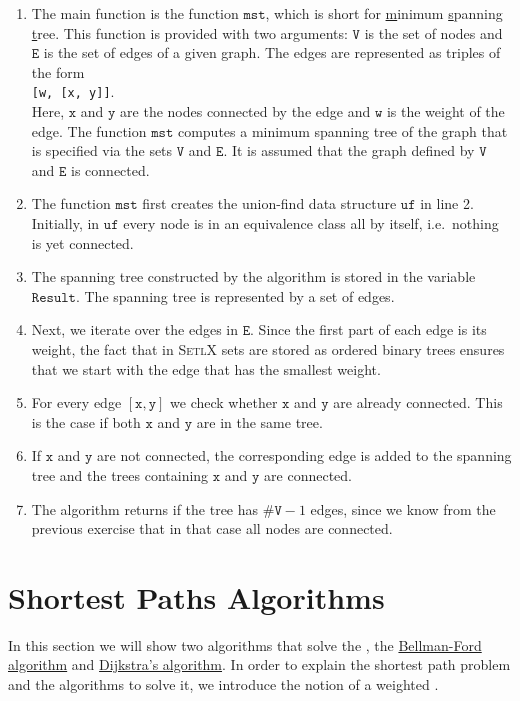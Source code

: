 \begin{enumerate}
\item The main function is the function $\mathtt{mst}$, which is short for \underline{m}inimum
      \underline{s}panning \underline{t}ree.  This function is provided with two arguments:
      $\mathtt{V}$ is the set of nodes and $\mathtt{E}$ is the set of edges of a given graph.  The edges are represented as
      triples of the form
      \\[0.2cm]
      \hspace*{1.3cm}
      \texttt{[w, [x, y]]}.
      \\[0.2cm] 
      Here, $\mathtt{x}$ and $\mathtt{y}$ are the nodes connected by the edge and $\mathtt{w}$ is the
      weight of the edge.  The function $\mathtt{mst}$ computes a minimum spanning tree of  the
      graph that is specified via the sets $\mathtt{V}$ and $\mathtt{E}$.  It is assumed that the graph
      defined by $\mathtt{V}$ and $\mathtt{E}$ is connected.
\item The function $\mathtt{mst}$ first creates the union-find data structure $\mathtt{uf}$ in line 2.
      Initially, in $\mathtt{uf}$ every node is in an equivalence class all by itself, i.e.~nothing is
      yet connected.
\item The spanning tree constructed by the algorithm is stored in the variable $\mathtt{Result}$.
      The spanning tree is represented by a set of edges.  
\item Next, we iterate over the edges in $\mathtt{E}$.  Since the first part of each edge is its
      weight, the fact that in \textsc{SetlX} sets are stored as ordered binary trees ensures that
      we start with the edge that has the smallest weight.
\item For every edge $[\mathtt{x},\mathtt{y}]$ we check whether $\mathtt{x}$ and $\mathtt{y}$ are already
      connected.  This is the case if both $\mathtt{x}$ and $\mathtt{y}$ are in the same tree.
\item If $\mathtt{x}$ and $\mathtt{y}$ are not connected, the corresponding edge is added to the
      spanning tree and the trees containing $\mathtt{x}$ and $\mathtt{y}$ are connected.
\item The algorithm returns if the tree has $\mathtt{\#V}-1$ edges, since we know from the previous
      exercise that in that case all nodes are connected.
\end{enumerate}


\section{Shortest Paths Algorithms}
In this section we will show two algorithms that solve the
\href{https://en.wikipedia.org/wiki/Shortest_path_problem}{}, the 
\href{https://en.wikipedia.org/wiki/Bellman-Ford_algorithm}{Bellman-Ford algorithm} and
\href{https://en.wikipedia.org/wiki/Dijkstra%27s_algorithm}{Dijkstra's algorithm}.  
In order to explain the shortest path problem and the algorithms to solve it, we introduce the notion
of a weighted \href{https://en.wikipedia.org/wiki/Directed_graph}{}.


